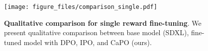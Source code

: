 \begin{figure}[t]
    \small\centering
    \texttt{[image: figure\_files/comparison\_single.pdf]}
    \caption{
    \textbf{Qualitative comparison for single reward fine-tuning}. We present qualitative comparison between base model (SDXL), fine-tuned model with DPO, IPO, and CaPO (ours).}
    \label{fig:single}
    \vspace{-10pt}
\end{figure}